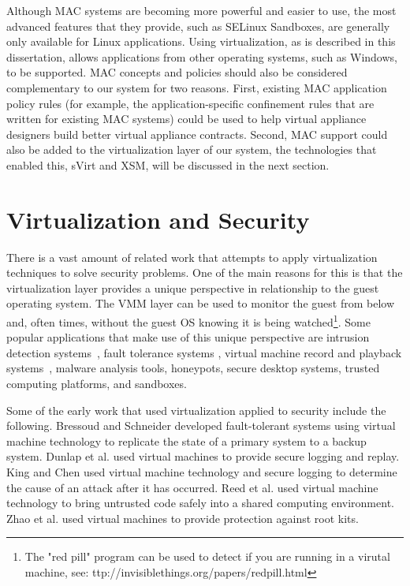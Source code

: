 Although MAC systems are becoming more powerful and easier to use, the most advanced features that they provide, such as SELinux Sandboxes, are generally only available for Linux applications. Using virtualization, as is described in this dissertation, allows applications from other operating systems, such as Windows, to be supported. MAC concepts and policies should also be considered complementary to our system for two reasons. First, existing MAC application policy rules (for example, the application-specific confinement rules that are written for existing MAC systems) could be used to help virtual appliance designers build better virtual appliance contracts. Second, MAC support could also be added to the virtualization layer of our system, the technologies that enabled this, sVirt\cite{sVirt_website} and XSM\cite{xsm_xen_summit_3rd}, will be discussed in the next section.

\section{Virtualization and Security}

There is a vast amount of related work that attempts to apply virtualization techniques to solve security problems. One of the main reasons for this is that the virtualization layer provides a unique perspective in relationship to the guest operating system. The VMM layer can be used to monitor the guest from below and, often times, without the guest OS knowing it is being watched\footnote{The "red pill" program can be used to detect if you are running in a virutal machine, see: ttp://invisiblethings.org/papers/redpill.html}. Some popular applications that make use of this unique perspective are intrusion detection systems~\cite{Panorama_07,VNIDA_08,VMFence_09,Psyco-Virt_07,Protecting_host_detectors_06,HyperSpector05, VMI_IDS_2003}, fault tolerance systems \cite{bressoud_1995}, virtual machine record and playback systems~\cite{dunlap_2002,king_2003}, malware analysis tools\cite{leet09_malware}, honeypots\cite{asrigo_2006}, secure desktop systems\cite{zhao_2005, Meushaw_2000, qubes-os_2010}, trusted computing platforms\cite{garfinkel_2003}, and sandboxes\cite{isolated_execution_2010}.

Some of the early work that used virtualization applied to security include the following. Bressoud and Schneider developed fault-tolerant systems using virtual machine technology to replicate the state of a primary system to a backup system\cite{bressoud_1995}. Dunlap et al. used virtual machines to provide secure logging and replay\cite{dunlap_2002}. King and Chen used virtual machine technology and secure logging to determine the cause of an attack after it has occurred\cite{king_2003}. Reed et al. used virtual machine technology to bring untrusted code safely into a shared computing environment\cite{reed_1999}. Zhao et al. used virtual machines to provide protection against root kits\cite{zhao_2005}.

